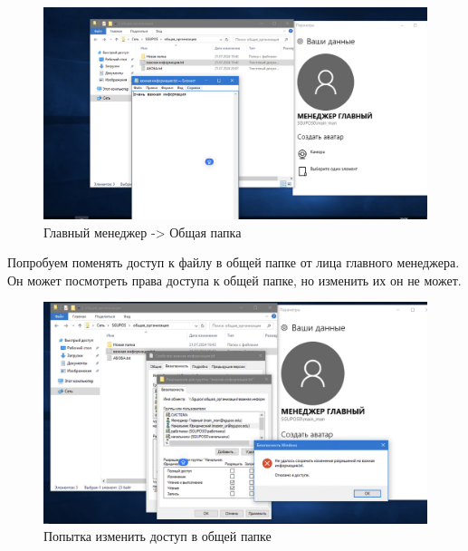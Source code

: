 \begin{figure}[H]
  \centering
  \includegraphics[width=1\textwidth]{pict/prac/76}
  \caption{Главный менеджер -> Общая папка}
\end{figure}
Попробуем поменять доступ к файлу в общей папке от лица главного менеджера.
Он может посмотреть права доступа к общей папке, но изменить их он не может.
\begin{figure}[H]
  \centering
  \includegraphics[width=1\textwidth]{pict/prac/78}
  \caption{Попытка изменить доступ в общей папке}
\end{figure}

